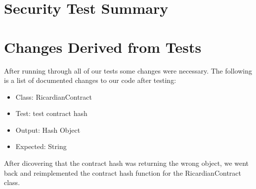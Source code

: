 \documentclass{article}
\begin{document}
\section{Security Test Summary}

\section{Changes Derived from Tests}
After running through all of our tests some changes were necessary. The following is a list of documented changes to our code after testing:\newline
\newline
\begin{itemize}
\item Class: RicardianContract
\item Test: test contract hash
\item Output: Hash Object
\item Expected: String
\end{itemize} 
After dicovering that the contract hash was returning the wrong object, we went back and reimplemented the contract hash function for the RicardianContract class.
\end{document}
